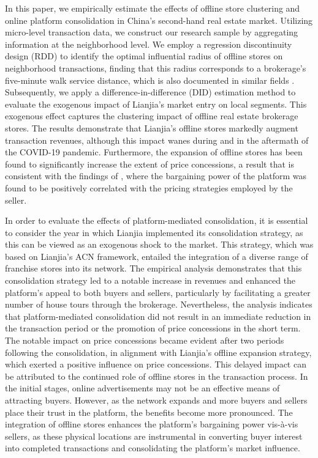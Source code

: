 \documentclass[11pt]{article}
\begin{document}
In this paper, we empirically estimate the effects of offline store clustering and online platform consolidation in China's second-hand real estate market. Utilizing micro-level transaction data, we construct our research sample by aggregating information at the neighborhood level. We employ a regression discontinuity design (RDD) to identify the optimal influential radius of offline stores on neighborhood transactions, finding that this radius corresponds to a brokerage's five-minute walk service distance, which is also documented in similar fields \citep{AZMI2012406}. Subsequently, we apply a difference-in-difference (DID) estimation method to evaluate the exogenous impact of Lianjia's market entry on local segments. This exogenous effect captures the clustering impact of offline real estate brokerage stores. The results demonstrate that Lianjia's offline stores markedly augment transaction revenues, although this impact wanes during and in the aftermath of the COVID-19 pandemic. Furthermore, the expansion of offline stores has been found to significantly increase the extent of price concessions, a result that is consistent with the findings of \citep{bergemann_data_2024}, where the bargaining power of the platform was found to be positively correlated with the pricing strategies employed by the seller.

In order to evaluate the effects of platform-mediated consolidation, it is essential to consider the year in which Lianjia implemented its consolidation strategy, as this can be viewed as an exogenous shock to the market. This strategy, which was based on Lianjia's ACN framework, entailed the integration of a diverse range of franchise stores into its network. The empirical analysis demonstrates that this consolidation strategy led to a notable increase in revenues and enhanced the platform's appeal to both buyers and sellers, particularly by facilitating a greater number of house tours through the brokerage. Nevertheless, the analysis indicates that platform-mediated consolidation did not result in an immediate reduction in the transaction period or the promotion of price concessions in the short term. The notable impact on price concessions became evident after two periods following the consolidation, in alignment with Lianjia's offline expansion strategy, which exerted a positive influence on price concessions. This delayed impact can be attributed to the continued role of offline stores in the transaction process. In the initial stages, online advertisements may not be an effective means of attracting buyers. However, as the network expands and more buyers and sellers place their trust in the platform, the benefits become more pronounced. The integration of offline stores enhances the platform's bargaining power vis-à-vis sellers, as these physical locations are instrumental in converting buyer interest into completed transactions and consolidating the platform's market influence.
\end{document}
